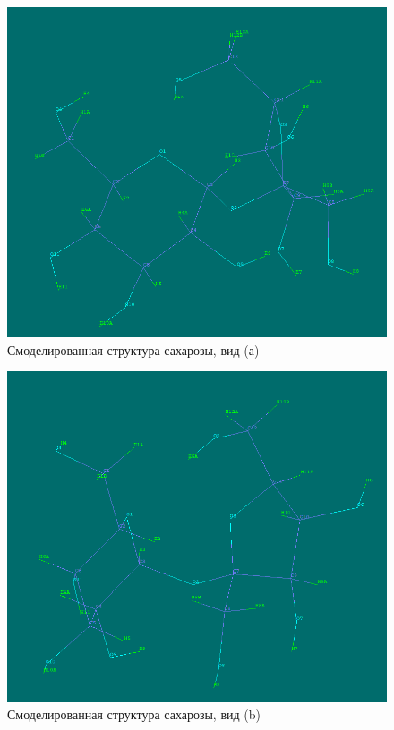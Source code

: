 \documentclass[a4paper, 12pt]{article}
\begin{document}
\begin{figure}[H]
	\centering
	\includegraphics[width=0.8\linewidth]{Molecule_1}
	\caption{Смоделированная структура сахарозы, вид (а)}
	\label{fig:sucrose_a}
\end{figure}

\begin{figure}[H]
	\centering
	\includegraphics[width=0.8\linewidth]{Molecule_2}
	\caption{Смоделированная структура сахарозы, вид (b)}
	\label{fig:sucrose_b}
\end{figure}
\end{document}
